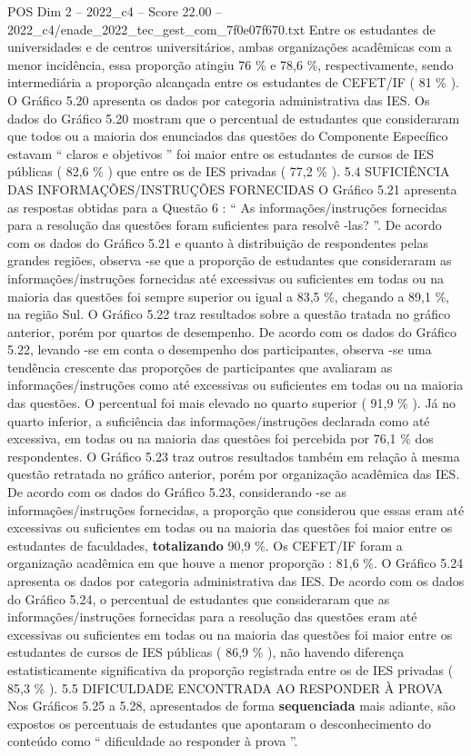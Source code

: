 \begin{textsample}{POS Dim 2 – 2022\_c4 – Score 22.00 – 2022\_c4/enade\_2022\_tec\_gest\_com\_7f0e07f670.txt}
Entre os estudantes de universidades e de centros universitários, ambas organizações acadêmicas com a menor incidência, essa proporção atingiu 76 \% e 78,6 \%, respectivamente, sendo intermediária a proporção alcançada entre os estudantes de CEFET/IF ( 81 \% ).
O Gráfico 5.20 apresenta os dados por categoria administrativa das IES.
Os dados do Gráfico 5.20 mostram que o percentual de estudantes que consideraram que todos ou a maioria dos enunciados das questões do Componente Específico estavam “ claros e objetivos ” foi maior entre os estudantes de cursos de IES públicas ( 82,6 \% ) que entre os de IES privadas ( 77,2 \% ). 5.4 SUFICIÊNCIA DAS INFORMAÇÕES/INSTRUÇÕES FORNECIDAS O Gráfico 5.21 apresenta as respostas obtidas para a Questão 6 : “ As informações/instruções fornecidas para a resolução das questões foram suficientes para resolvê -las? ”.
De acordo com os dados do Gráfico 5.21 e quanto à distribuição de respondentes pelas grandes regiões, observa -se que a proporção de estudantes que consideraram as informações/instruções fornecidas até excessivas ou suficientes em todas ou na maioria das questões foi sempre superior ou igual a 83,5 \%, chegando a 89,1 \%, na região Sul.
O Gráfico 5.22 traz resultados sobre a questão tratada no gráfico anterior, porém por quartos de desempenho.
De acordo com os dados do Gráfico 5.22, levando -se em conta o desempenho dos participantes, observa -se uma tendência crescente das proporções de participantes que avaliaram as informações/instruções como até excessivas ou suficientes em todas ou na maioria das questões.
O percentual foi mais elevado no quarto superior ( 91,9 \% ).
Já no quarto inferior, a suficiência das informações/instruções declarada como até excessiva, em todas ou na maioria das questões foi percebida por 76,1 \% dos respondentes.
O Gráfico 5.23 traz outros resultados também em relação à mesma questão retratada no gráfico anterior, porém por organização acadêmica das IES.
De acordo com os dados do Gráfico 5.23, considerando -se as informações/instruções fornecidas, a proporção que considerou que essas eram até excessivas ou suficientes em todas ou na maioria das questões foi maior entre os estudantes de faculdades, \textbf{totalizando} 90,9 \%.
Os CEFET/IF foram a organização acadêmica em que houve a menor proporção : 81,6 \%.
O Gráfico 5.24 apresenta os dados por categoria administrativa das IES.
De acordo com os dados do Gráfico 5.24, o percentual de estudantes que consideraram que as informações/instruções fornecidas para a resolução das questões eram até excessivas ou suficientes em todas ou na maioria das questões foi maior entre os estudantes de cursos de IES públicas ( 86,9 \% ), não havendo diferença estatisticamente significativa da proporção registrada entre os de IES privadas ( 85,3 \% ). 5.5 DIFICULDADE ENCONTRADA AO RESPONDER À PROVA Nos Gráficos 5.25 a 5.28, apresentados de forma \textbf{sequenciada} mais adiante, são expostos os percentuais de estudantes que apontaram o desconhecimento do conteúdo como “ dificuldade ao responder à prova ”.

\end{textsample}
